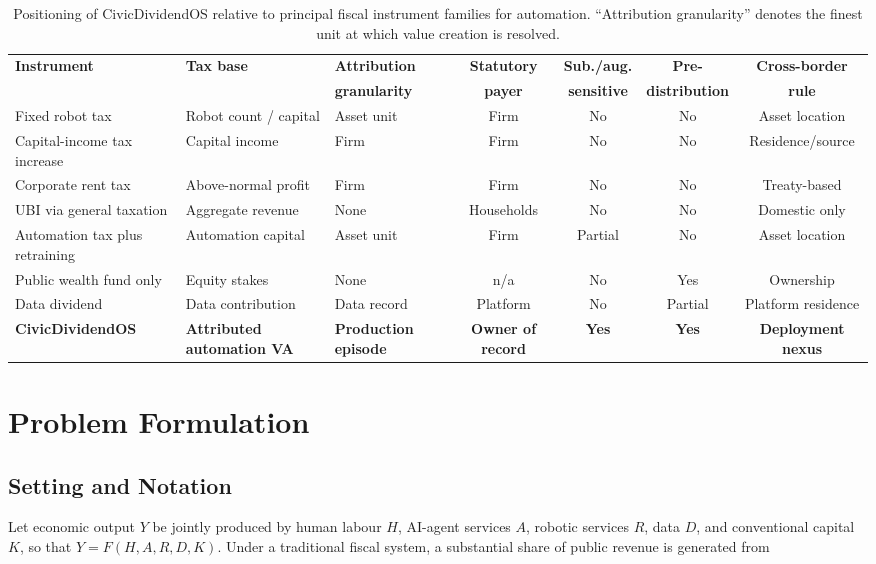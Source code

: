 \documentclass[journal]{IEEEtran}
\theoremstyle{plain}
\theoremstyle{definition}
\begin{document}
\begin{table}[!t]
\centering
\caption{Positioning of CivicDividendOS relative to principal fiscal instrument families for automation. ``Attribution granularity'' denotes the finest unit at which value creation is resolved.}
\label{tab:compare}
\scriptsize
\begin{tabular}{@{}l l l c c c c@{}}
\toprule
\textbf{Instrument} & \textbf{Tax base} & \textbf{Attribution} & \textbf{Statutory} & \textbf{Sub./aug.} & \textbf{Pre-} & \textbf{Cross-border} \\
 & & \textbf{granularity} & \textbf{payer} & \textbf{sensitive} & \textbf{distribution} & \textbf{rule} \\
\midrule
Fixed robot tax & Robot count / capital & Asset unit & Firm & No & No & Asset location \\
Capital-income tax increase & Capital income & Firm & Firm & No & No & Residence/source \\
Corporate rent tax & Above-normal profit & Firm & Firm & No & No & Treaty-based \\
UBI via general taxation & Aggregate revenue & None & Households & No & No & Domestic only \\
Automation tax plus retraining & Automation capital & Asset unit & Firm & Partial & No & Asset location \\
Public wealth fund only & Equity stakes & None & n/a & No & Yes & Ownership \\
Data dividend & Data contribution & Data record & Platform & No & Partial & Platform residence \\
\textbf{CivicDividendOS} & \textbf{Attributed automation VA} & \textbf{Production episode} & \textbf{Owner of record} & \textbf{Yes} & \textbf{Yes} & \textbf{Deployment nexus} \\
\bottomrule
\end{tabular}
\end{table}

\section{Problem Formulation}
\label{sec:problem}

\subsection{Setting and Notation}

Let economic output $Y$ be jointly produced by human labour $H$, AI-agent services $A$, robotic services $R$, data $D$, and conventional capital $K$, so that $Y=F(H,A,R,D,K)$. Under a traditional fiscal system, a substantial share of public revenue is generated from
\end{document}
